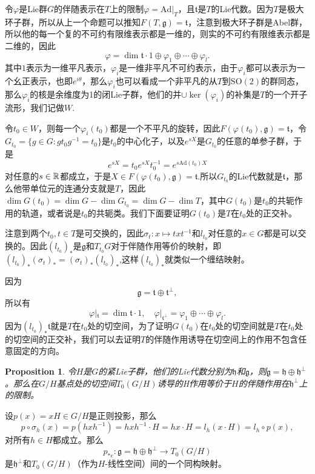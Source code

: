 \documentclass[8pt]{book}
\theoremstyle{plain}
\newtheorem{pro}[defi]{Proposition}
\newcommand{\lag}{{\mathfrak{g}}}  %
\begin{document}
令$\varphi$是Lie群$G$的伴随表示在$T$上的限制$\varphi=\mathrm{Ad}|_T$，且$\mathfrak{t}$是$T$的Lie代数。因为$T$是极大环子群，所以从上一个命题可以推知$F(T,\lag)=\mathfrak{t}$，注意到极大环子群是Abel群，所以他的每一个复的不可约有限维表示都是一维的，则实的不可约有限维表示都是二维的，因此
\[
\varphi=\dim \mathfrak{t}\cdot 1\oplus \varphi_1\oplus\cdots \oplus \varphi_l.
\]
其中$1$表示为一维平凡表示，$\varphi_i$是一维非平凡不可约表示，由于$\varphi_i$都可以表示为一个幺正表示，也即$e^{i\theta}$，那么$\varphi_i$也可以看成一个非平凡的从$T$到$\mathrm{SO}(2)$的群同态，那么$\varphi_i$的核是余维度为1的闭Lie子群，他们的并$\cup\ker(\varphi_i)$的补集是$T$的一个开子流形，我们记做$W$.

令$t_0\in W$，则每一个$\varphi_i(t_0)$都是一个不平凡的旋转，因此$F(\varphi(t_0),\lag)=\mathfrak{t}$，令$G_{t_0}=\{g\in G:gt_0g^{-1}=t_0\}$是$t_0$的中心化子，以及$e^{sX}$是$G_{t_0}$的任意的单参子群，于是
\[
	e^{sX}=t_0e^{sX}t_0^{-1}=e^{s\mathrm{Ad}(t_0)X}
\]
对任意的$s\in\mathbb{R}$都成立，于是$X\in F(\varphi(t_0),\lag)=\mathfrak{t}$.所以$G_{t_0}$的Lie代数就是$\mathfrak{t}$，那么他带单位元的连通分支就是$T$，因此$\dim G(t_0)=\dim G -\dim G_{t_0}=\dim G -\dim T$，其中$G(t_0)$是$t_0$的共轭作用的轨道，或者说是$t_0$的共轭类。我们下面要证明$G(t_0)$是$T$在$t_0$处的正交补。

注意到两个$t_0,t\in T$是可交换的，因此$\sigma_t:x\mapsto txt^{-1}$和$l_{t_0}$对任意的$x\in G$都是可以交换的。因此$(l_{t_0})_*$是$\lag$和$T_{t_0}G$对于伴随作用等价的映射，即$(l_{t_0})_*(\sigma_t)_*=(\sigma_t)_*(l_{t_0})_*$,这样$(l_{t_0})_*$就类似一个缠结映射。

因为
\[
\lag=\mathfrak{t}\oplus\mathfrak{t}^\bot,
\]
所以有
\[
\varphi|_\mathfrak{t}=\dim \mathfrak{t}\cdot 1,\quad \varphi|_{\mathfrak{t}^\bot}=\varphi_1\oplus\cdots \oplus \varphi_l.
\]
因为$(l_{t_0})_*\mathfrak{t}$就是$T$在$t_0$处的切空间，为了证明$G(t_0)$在$t_0$处的切空间就是$T$在$t_0$处的切空间的正交补，我们可以去证明$T$的伴随作用诱导在切空间上的作用不包含任意固定的方向。

\begin{pro}
令$H$是$G$的紧Lie子群，他们的Lie代数分别为$\mathfrak{h}$和$\lag$，则$\lag=\mathfrak{h}\oplus\mathfrak{h}^\bot$。那么在$G/H$基点处的切空间$T_0(G/H)$诱导的H作用等价于$H$的伴随作用在$\mathfrak{h}^\bot$上的限制。
\end{pro}
设$p(x)=xH\in G/H$是正则投影，那么
\[
p\circ \sigma_h(x)=p(hxh^{-1})=hxh^{-1}\cdot H=hx\cdot H=l_h(x\cdot H)=l_h\circ p(x),
\]
对所有$h\in H$都成立。那么
\[
p_{*e}:\lag=\mathfrak{h}\oplus\mathfrak{h}^\bot\to T_0(G/H)
\]
是$\mathfrak{h}^\bot$和$T_0(G/H)$（作为$H$-线性空间）间的一个同构映射。
\end{document}
